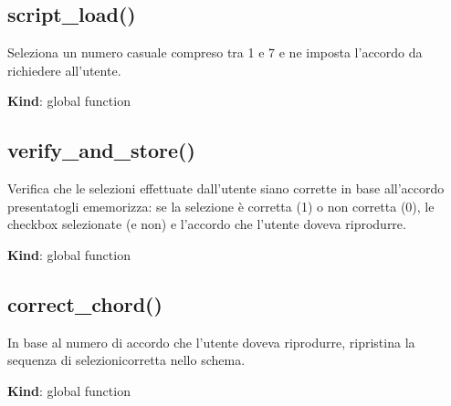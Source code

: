 \protect\hypertarget{script_load}{}{}

\hypertarget{script_load}{%
\subsection{script\_load()}\label{script_load}}

Seleziona un numero casuale compreso tra 1 e 7 e ne imposta l'accordo da
richiedere all'utente.

\textbf{Kind}: global function\\
\protect\hypertarget{verify_and_store}{}{}

\hypertarget{verify_and_store}{%
\subsection{verify\_and\_store()}\label{verify_and_store}}

Verifica che le selezioni effettuate dall'utente siano corrette in base
all'accordo presentatogli ememorizza: se la selezione è corretta (1) o
non corretta (0), le checkbox selezionate (e non) e l'accordo che
l'utente doveva riprodurre.

\textbf{Kind}: global function\\
\protect\hypertarget{correct_chord}{}{}

\hypertarget{correct_chord}{%
\subsection{correct\_chord()}\label{correct_chord}}

In base al numero di accordo che l'utente doveva riprodurre, ripristina
la sequenza di selezionicorretta nello schema.

\textbf{Kind}: global function
